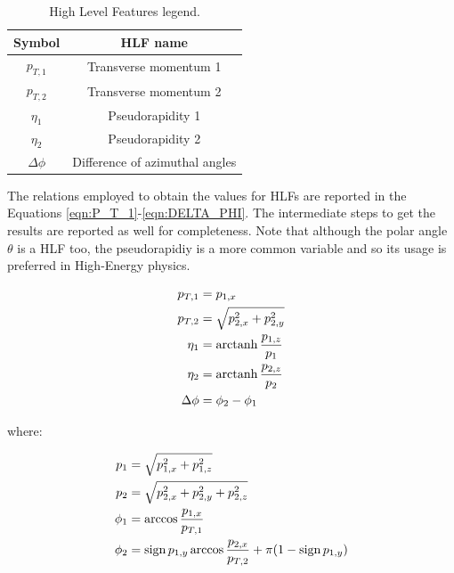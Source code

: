 \begin{table}[H]
	\begin{center}
		\begin{tabular}{c c}
			\toprule
			Symbol	&	HLF name	\\
			\midrule
			$p_{T,1}$		&	Transverse momentum 1			\\
			$p_{T,2}$		&	Transverse momentum 2			\\
			$\eta_{1}$		&	Pseudorapidity 1				\\
			$\eta_{2}$		&	Pseudorapidity 2				\\
			$\Delta \phi$	&	Difference of azimuthal angles	\\
			\bottomrule
		\end{tabular}
		\caption{High Level Features legend.}
		\label{tab:HLF}
	\end{center}
\end{table}

The relations employed to obtain the values for HLFs are reported in the Equations \ref{eqn:P_T_1}-\ref{eqn:DELTA_PHI}. The intermediate steps to get the results are reported as well for completeness. Note that although the polar angle $\theta$ is a HLF too, the pseudorapidiy is a more common variable and so its usage is preferred in High-Energy physics.

\begin{align}
	p_{T,1} &= p_{1,x}	\label{eqn:P_T_1}	\\
	p_{T,2} &= \sqrt{ p_{2,x}^2 + p_{2,y}^2 }	\label{eqn:P_T_2}	\\
	\eta_{1} &= \operatorname{arctanh}{ \frac{p_{1,z}}{p_{1}} }	\label{eqn:PR_1}	\\
	\eta_{2} &= \operatorname{arctanh}{ \frac{p_{2,z}}{p_{2}} }	\label{eqn:PR_2}	\\
	\Delta \phi &= \phi_{2} - \phi_{1}	\label{eqn:DELTA_PHI}
\end{align}

\noindent
where:

\begin{align}
	p_{1} &= \sqrt{ p_{1,x}^2 + p_{1,z}^2 }	\\
	p_{2} &= \sqrt{ p_{2,x}^2 + p_{2,y}^2 + p_{2,z}^2 }	\\
	\phi_{1} &= \arccos{ \frac{p_{1,x}}{p_{T,1}} }	\\
	\phi_{2} &= \operatorname{sign}{p_{1,y}} \arccos{ \frac{p_{2,x}}{p_{T,2}} } + \pi (1 - \operatorname{sign}{p_{1,y}})
\end{align}





